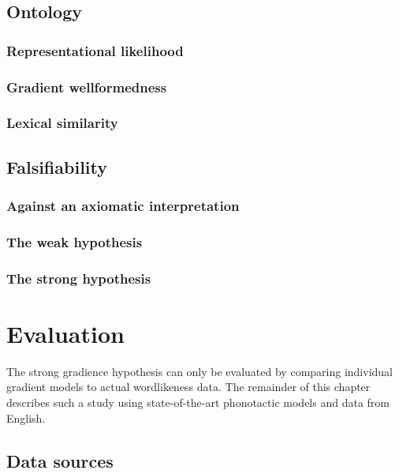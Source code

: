 \subsection{Ontology}
\subsubsection{Representational likelihood}
\subsubsection{Gradient wellformedness}
\subsubsection{Lexical similarity}
\subsection{Falsifiability}
\subsubsection{Against an axiomatic interpretation}
\subsubsection{The weak hypothesis}
\subsubsection{The strong hypothesis}
\section{Evaluation}

The strong gradience hypothesis can only be evaluated by comparing individual gradient models to actual wordlikeness data. The remainder of this chapter describes such a study using state-of-the-art phonotactic models and data from English.

\subsection{Data sources}


